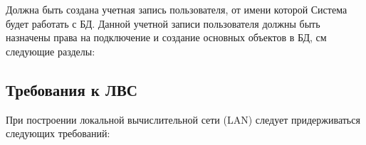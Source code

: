 Должна быть создана учетная запись пользователя, от имени которой Система будет работать с БД.
Данной учетной записи пользователя должны быть назначены права на подключение и создание основных объектов в БД, см следующие разделы: %

%
%
%
%
%
%


\subsection{Требования к ЛВС}

При построении локальной вычислительной сети (LAN) следует придерживаться следующих требований:
